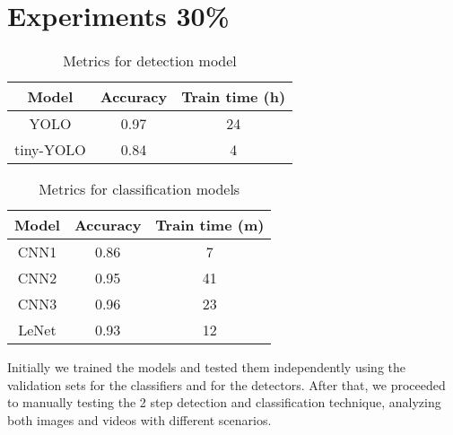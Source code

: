 \section{Experiments 30\%}

\begin{table}[h!]
	\begin{center}
		\begin{tabular}{|c|c|c|}
			\hline
			Model & Accuracy & Train time (h) \\
			\hline\hline
			YOLO & 0.97 & 24 \\
			tiny-YOLO & 0.84 & 4 \\
			\hline
		\end{tabular}
	\end{center}
	\caption{Metrics for detection model}
	\label{yolo-metrics}
\end{table}

\begin{table}[h!]
	\begin{center}
		\begin{tabular}{|c|c|c|}
			\hline
			Model & Accuracy & Train time (m) \\
			\hline\hline
			CNN1 & 0.86 & 7 \\
			CNN2 & 0.95 & 41 \\
			CNN3 & 0.96 & 23 \\
			LeNet & 0.93 & 12 \\
			\hline
		\end{tabular}
	\end{center}
	\caption{Metrics for classification models}
	\label{class-metrics}
\end{table}

Initially we trained the models and tested them independently using the validation sets for the classifiers and for the detectors. After that, we proceeded to manually testing the 2 step detection and classification technique, analyzing both images and videos with different scenarios. 


